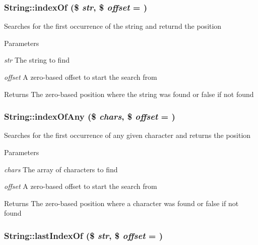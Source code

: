 \hypertarget{classString_a5069041d10f95e4ec9a4be3cd17ab180}{
\subsubsection[{indexOf}]{\setlength{\rightskip}{0pt plus 5cm}String::indexOf (\$ {\em str}, \/  \$ {\em offset} = {})}}
\label{classString_a5069041d10f95e4ec9a4be3cd17ab180}
Searches for the first occurrence of the string and returnd the position 
\begin{DoxyParams}{Parameters}
\item[{\em str}]The string to find \item[{\em offset}]A zero-\/based offset to start the search from \end{DoxyParams}
\begin{DoxyReturn}{Returns}
The zero-\/based position where the string was found or false if not found 
\end{DoxyReturn}
\hypertarget{classString_a1c8a1df4030974f7ae48f59c1a9dca80}{
\subsubsection[{indexOfAny}]{\setlength{\rightskip}{0pt plus 5cm}String::indexOfAny (\$ {\em chars}, \/  \$ {\em offset} = {})}}
\label{classString_a1c8a1df4030974f7ae48f59c1a9dca80}
Searches for the first occurrence of any given character and returns the position 
\begin{DoxyParams}{Parameters}
\item[{\em chars}]The array of characters to find \item[{\em offset}]A zero-\/based offset to start the search from \end{DoxyParams}
\begin{DoxyReturn}{Returns}
The zero-\/based position where a character was found or false if not found 
\end{DoxyReturn}
\hypertarget{classString_a18806fe790375032e3fb268f649914d7}{
\subsubsection[{lastIndexOf}]{\setlength{\rightskip}{0pt plus 5cm}String::lastIndexOf (\$ {\em str}, \/  \$ {\em offset} = {})}}
